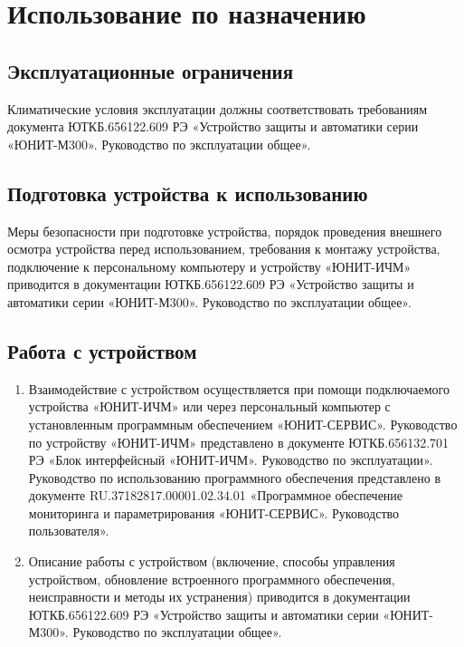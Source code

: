 \clearpage
\color{unimain}\section[Использование по назначению]{Использование по назначению}\label{sec:using}
\color{black}

\color{uniblue}\subsection{Эксплуатационные ограничения}\color{black}
Климатические условия эксплуатации должны соответствовать требованиям документа ЮТКБ.656122.609 РЭ «Устройство защиты и автоматики серии «ЮНИТ-М300». Руководство по эксплуатации общее».

\color{uniblue}\subsection{Подготовка устройства к использованию}\color{black}
Меры безопасности при подготовке устройства, порядок проведения внешнего осмотра устройства перед использованием, требования к монтажу устройства, подключение к персональному компьютеру и устройству «ЮНИТ-ИЧМ» приводится в документации ЮТКБ.656122.609 РЭ «Устройство защиты и автоматики серии «ЮНИТ-М300». Руководство по эксплуатации общее».

\color{uniblue}\subsection{Работа с устройством}\color{black}

\begin{enumerate}
\item
Взаимодействие с устройством осуществляется при помощи подключаемого устройства «ЮНИТ-ИЧМ» или через персональный компьютер с установленным программным обеспечением «ЮНИТ-СЕРВИС». Руководство по устройству «ЮНИТ-ИЧМ» представлено в документе ЮТКБ.656132.701 РЭ «Блок интерфейсный «ЮНИТ-ИЧМ». Руководство по эксплуатации». Руководство по использованию программного обеспечения представлено в документе RU.37182817.00001.02.34.01 «Программное обеспечение мониторинга и параметрирования «ЮНИТ-СЕРВИС». Руководство пользователя».

\item
Описание работы с устройством (включение, способы управления устройством, обновление встроенного программного обеспечения, неисправности и методы их устранения) приводится в документации ЮТКБ.656122.609 РЭ «Устройство защиты и автоматики серии «ЮНИТ-М300». Руководство по эксплуатации общее».
\end{enumerate}